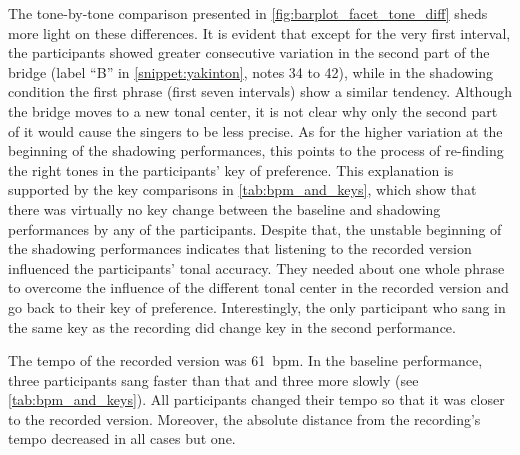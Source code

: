 The tone-by-tone comparison presented in \cref{fig:barplot_facet_tone_diff} sheds more light on these differences.
It is evident that except for the very first interval, the participants showed greater consecutive variation in the second part of the bridge (label \enquote{B} in \cref{snippet:yakinton}, notes 34 to 42), while in the shadowing condition the first phrase (first seven intervals) show a similar tendency.
Although the bridge moves to a new tonal center, it is not clear why only the second part of it would cause the singers to be less precise.
As for the higher variation at the beginning of the shadowing performances, this points to the process of re-finding the right tones in the participants' key of preference.
This explanation is supported by the key comparisons in \cref{tab:bpm_and_keys}, which show that there was virtually no key change between the baseline and shadowing performances by any of the participants.
Despite that, the unstable beginning of the shadowing performances indicates that listening to the recorded version influenced the participants' tonal accuracy.
They needed about one whole phrase to overcome the influence of the different tonal center in the recorded version and go back to their key of preference.
Interestingly, the only participant who sang in the same key as the recording did change key in the second performance.

The tempo of the recorded version was \SI{61}{\ac{bpm}}.
In the baseline performance, three participants sang faster than that and three more slowly (see \cref{tab:bpm_and_keys}).
All participants changed their tempo so that it was closer to the recorded version.
Moreover, the absolute distance from the recording's tempo decreased in all cases but one.


